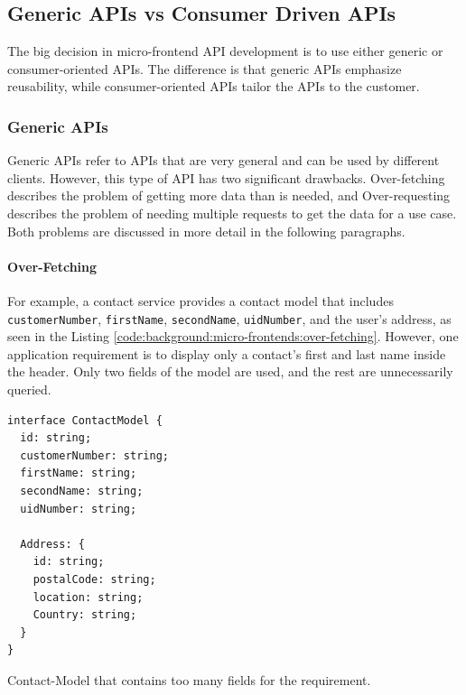 \subsection{Generic APIs vs Consumer Driven APIs}\label{subsection:background:micro-frontend:generic-vs-consumer-driven-apis}

The big decision in micro-frontend \ac{API} development is to use either generic or consumer-oriented \acp{API}. The difference is that generic \acp{API} emphasize reusability, while consumer-oriented \acp{API} tailor the \acp{API} to the customer.

\subsubsection{Generic \acp{API}}\label{subsubsection:background:micro-frontend:generic-vs-consumer-driven-apis:generic-apis}

Generic \acp{API} refer to \acp{API} that are very general and can be used by different clients. However, this type of \ac{API} has two significant drawbacks. Over-fetching describes the problem of getting more data than is needed, and Over-requesting describes the problem of needing multiple requests to get the data for a use case. Both problems are discussed in more detail in the following paragraphs. \cite{misc:2019:leitner:background:micro-frontends:backend-for-frontends}

\paragraph{Over-Fetching}\label{paragraph:background:micro-frontend:generic-vs-consumer-driven-apis:generic-apis:over-fetching}


For example, a contact service provides a contact model that includes \texttt{customerNumber}, \texttt{firstName}, \texttt{secondName}, \texttt{uidNumber}, and the user's address, as seen in the Listing \ref{code:background:micro-frontends:over-fetching}. However, one application requirement is to display only a contact's first and last name inside the header. Only two fields of the model are used, and the rest are unnecessarily queried. \cite{misc:2019:leitner:background:micro-frontends:backend-for-frontends}

\ifshowListings
\begin{listing}[H]
    \begin{verbatim}
interface ContactModel {
  id: string;
  customerNumber: string;
  firstName: string;
  secondName: string;
  uidNumber: string;

  Address: {
    id: string;
    postalCode: string;
    location: string;
    Country: string;
  }
}
    \end{verbatim}
    \caption{Contact-Model that contains too many fields for the requirement.}\label{code:background:micro-frontends:over-fetching}
\end{listing}
\fi

